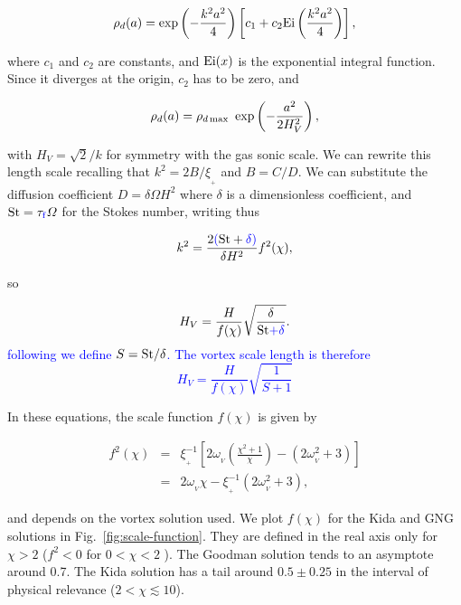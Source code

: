 \documentclass[apj]{emulateapj}
\def\blue#1{\textcolor{blue}{ #1}}
\newcommand{\Fig}[1]{Fig.~\ref{#1}}
\newcommand{\fig}[1]{\Fig{#1}}
\newcommand{\beq}{\begin{equation}}
\newcommand{\eeq}{\end{equation}}
\newcommand{\beqn}{\begin{eqnarray}}
\newcommand{\eeqn}{\end{eqnarray}}
\newcommand{\epsp}{\xi_{_{+}}}
\newcommand{\tauf}{\tau_{\rm \blue{f}}}
\newcommand{\St}{{\rm St}}
\begin{document}
\beq
\rho_d(a) = \exp\left(-\frac{k^2a^2}{4}\right)  \left[c_1 + c_2 {\rm
    Ei}\left(\frac{k^2a^2}{4}\right)\right],
\eeq

\noindent where $c_1$ and $c_2$ are constants, and ${\rm Ei}(x)$ is
the exponential integral function. Since it diverges at the origin, $c_2$ has to be zero, and 

\beq
\rho_d(a) = \rho_{d\,{\rm max}} \ \exp\left(-\frac{a^2}{2H_V^2}\right),
\label{eq:gen_axi}
\eeq

\noindent with $H_V = \sqrt{2}/k$ for symmetry with the gas sonic scale. We can 
rewrite this length scale recalling that $k^2=2B/\epsp$ and
$B=C/D$. We can substitute the diffusion coefficient $D=\delta \varOmega H^2$ where 
$\delta$ is a dimensionless coefficient, and $\St = \tauf\varOmega$ for 
the Stokes number, writing thus 

\beqn
\label{eq:k}
k^2 = \frac{2\blue{(}\St+\blue{\delta)}}{\delta H^2} f^2(\chi),
\eeqn 

\noindent so

\beq
 H_V = \frac{H}{f(\chi)} \sqrt{\frac{\delta}{\St\blue{+\delta}}}. 
\label{eq:hv-pre}
\eeq
\noindent \blue{following \cite{Jacquet12} we define $S=\St/\delta$. The vortex scale
length is therefore
\beq
H_V = \frac{H}{f(\chi)} \sqrt{\frac{1}{S+1}}
\label{eq:hv}
\eeq}

\noindent In these equations, the scale function $f(\chi)$ is given by 

\beqn
f^2(\chi) &=& \epsp^{-1} \left[2\omega_{_V}\left(\frac{\chi^2+1}{\chi}\right) - (2\omega_{_V}^2 + 3) \right]\nonumber \\
          &=& 2\omega_{_V}\chi - \epsp^{-1}(2\omega_{_V}^2 + 3),
\label{eq:scale-function}
\eeqn

\noindent and depends on the vortex solution
used. We plot $f(\chi)$ for the Kida and GNG solutions in
\fig{fig:scale-function}. They are defined in the real axis only for $\chi > 2$ ($f^2
< 0$ for $0 < \chi < 2$ ). The Goodman solution tends to an asymptote
around 0.7. The Kida solution has a  tail around $0.5\pm0.25$ in the
interval of physical relevance ($2 < \chi \lesssim 10$). %
\end{document}
